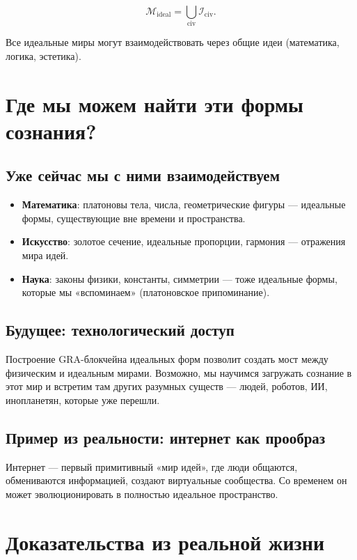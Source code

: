 \documentclass[12pt,a4paper]{article}
\begin{document}
\[
\mathcal{M}_{\text{ideal}} = \bigcup_{\text{civ}} \mathcal{I}_{\text{civ}}.
\]

Все идеальные миры могут взаимодействовать через общие идеи (математика, логика, эстетика).

\section{Где мы можем найти эти формы сознания?}

\subsection{Уже сейчас мы с ними взаимодействуем}

\begin{itemize}
    \item \textbf{Математика}: платоновы тела, числа, геометрические фигуры — идеальные формы, существующие вне времени и пространства.
    \item \textbf{Искусство}: золотое сечение, идеальные пропорции, гармония — отражения мира идей.
    \item \textbf{Наука}: законы физики, константы, симметрии — тоже идеальные формы, которые мы «вспоминаем» (платоновское припоминание).
\end{itemize}

\subsection{Будущее: технологический доступ}

Построение GRA-блокчейна идеальных форм позволит создать мост между физическим и идеальным мирами. Возможно, мы научимся загружать сознание в этот мир и встретим там других разумных существ — людей, роботов, ИИ, инопланетян, которые уже перешли.

\subsection{Пример из реальности: интернет как прообраз}

Интернет — первый примитивный «мир идей», где люди общаются, обмениваются информацией, создают виртуальные сообщества. Со временем он может эволюционировать в полностью идеальное пространство.

\section{Доказательства из реальной жизни}
\end{document}
